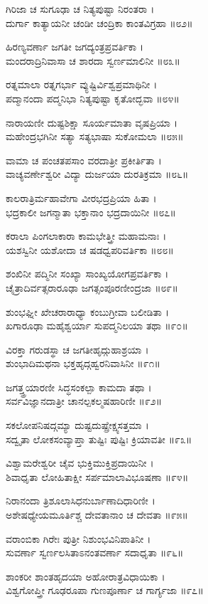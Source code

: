 ಗಿರಿಜಾ ಚ ಸುಗೂಢಾ ಚ ನಿತ್ಯಪುಷ್ಟಾ ನಿರಂತರಾ ।\\
ದುರ್ಗಾ ಕಾತ್ಯಾಯನೀ ಚಂಡೀ ಚಂದ್ರಿಕಾ ಕಾಂತವಿಗ್ರಹಾ ॥೮೨॥

ಹಿರಣ್ಯವರ್ಣಾ ಜಗತೀ ಜಗದ್ಯಂತ್ರಪ್ರವರ್ತಿಕಾ ।\\
ಮಂದರಾದ್ರಿನಿವಾಸಾ ಚ ಶಾರದಾ ಸ್ವರ್ಣಮಾಲಿನೀ ॥೮೩॥

ರತ್ನಮಾಲಾ ರತ್ನಗರ್ಭಾ ವ್ಯುಷ್ಟಿರ್ವಿಶ್ವಪ್ರಮಾಥಿನೀ ।\\
ಪದ್ಮಾನಂದಾ ಪದ್ಮನಿಭಾ ನಿತ್ಯಪುಷ್ಟಾ ಕೃತೋದ್ಭವಾ ॥೮೪॥

ನಾರಾಯಣೀ ದುಷ್ಟಶಿಕ್ಷಾ ಸೂರ್ಯಮಾತಾ ವೃಷಪ್ರಿಯಾ ।\\
ಮಹೇಂದ್ರಭಗಿನೀ ಸತ್ಯಾ ಸತ್ಯಭಾಷಾ ಸುಕೋಮಲಾ ॥೮೫॥

ವಾಮಾ ಚ ಪಂಚತಪಸಾಂ ವರದಾತ್ರೀ ಪ್ರಕೀರ್ತಿತಾ ।\\
ವಾಚ್ಯವರ್ಣೇಶ್ವರೀ ವಿದ್ಯಾ ದುರ್ಜಯಾ ದುರತಿಕ್ರಮಾ ॥೮೬॥

ಕಾಲರಾತ್ರಿರ್ಮಹಾವೇಗಾ ವೀರಭದ್ರಪ್ರಿಯಾ ಹಿತಾ ।\\
ಭದ್ರಕಾಲೀ ಜಗನ್ಮಾತಾ ಭಕ್ತಾನಾಂ ಭದ್ರದಾಯಿನೀ ॥೮೭॥

ಕರಾಲಾ ಪಿಂಗಲಾಕಾರಾ ಕಾಮಭೇತ್ತ್ರೀ ಮಹಾಮನಾಃ ।\\
ಯಶಸ್ವಿನೀ ಯಶೋದಾ ಚ ಷಡಧ್ವಪರಿವರ್ತಿಕಾ ॥೮೮॥

ಶಂಖಿನೀ ಪದ್ಮಿನೀ ಸಂಖ್ಯಾ ಸಾಂಖ್ಯಯೋಗಪ್ರವರ್ತಿಕಾ ।\\
ಚೈತ್ರಾದಿರ್ವತ್ಸರಾರೂಢಾ ಜಗತ್ಸಂಪೂರಣೀಂದ್ರಜಾ ॥೮೯॥

ಶುಂಭಘ್ನೀ ಖೇಚರಾರಾಧ್ಯಾ ಕಂಬುಗ್ರೀವಾ ಬಲೀಡಿತಾ ।\\
ಖಗಾರೂಢಾ ಮಹೈಶ್ವರ್ಯಾ ಸುಪದ್ಮನಿಲಯಾ ತಥಾ ॥೯೦॥

ವಿರಕ್ತಾ ಗರುಡಸ್ಥಾ ಚ ಜಗತೀಹೃದ್ಗುಹಾಶ್ರಯಾ ।\\
ಶುಂಭಾದಿಮಥನಾ ಭಕ್ತಹೃದ್ಗಹ್ವರನಿವಾಸಿನೀ ॥೯೧॥

ಜಗತ್ತ್ತ್ರಯಾರಣೀ ಸಿದ್ಧಸಂಕಲ್ಪಾ ಕಾಮದಾ ತಥಾ ।\\
ಸರ್ವವಿಜ್ಞಾನದಾತ್ರೀ ಚಾನಲ್ಪಕಲ್ಮಷಹಾರಿಣೀ ॥೯೨॥

ಸಕಲೋಪನಿಷದ್ಗಮ್ಯಾ ದುಷ್ಟದುಷ್ಪ್ರೇಕ್ಷ್ಯಸತ್ತಮಾ ।\\
ಸದ್ವೃತಾ ಲೋಕಸಂವ್ಯಾಪ್ತಾ ತುಷ್ಟಿಃ ಪುಷ್ಟಿಃ ಕ್ರಿಯಾವತೀ ॥೯೩॥

ವಿಶ್ವಾಮರೇಶ್ವರೀ ಚೈವ ಭುಕ್ತಿಮುಕ್ತಿಪ್ರದಾಯಿನೀ ।\\
ಶಿವಾಧೃತಾ ಲೋಹಿತಾಕ್ಷೀ ಸರ್ಪಮಾಲಾವಿಭೂಷಣಾ ॥೯೪॥

ನಿರಾನಂದಾ ತ್ರಿಶೂಲಾಸಿಧನುರ್ಬಾಣಾದಿಧಾರಿಣೀ ।\\
ಅಶೇಷಧ್ಯೇಯಮೂರ್ತಿಶ್ಚ ದೇವತಾನಾಂ ಚ ದೇವತಾ ॥೯೫॥

ವರಾಂಬಿಕಾ ಗಿರೇಃ ಪುತ್ರೀ ನಿಶುಂಭವಿನಿಪಾತಿನೀ ।\\
ಸುವರ್ಣಾ ಸ್ವರ್ಣಲಸಿತಾಽನಂತವರ್ಣಾ ಸದಾಧೃತಾ ॥೯೬॥

ಶಾಂಕರೀ ಶಾಂತಹೃದಯಾ ಅಹೋರಾತ್ರವಿಧಾಯಿಕಾ ।\\
ವಿಶ್ವಗೋಪ್ತ್ರೀ ಗೂಢರೂಪಾ ಗುಣಪೂರ್ಣಾ ಚ ಗಾರ್ಗ್ಯಜಾ ॥೯೭॥

